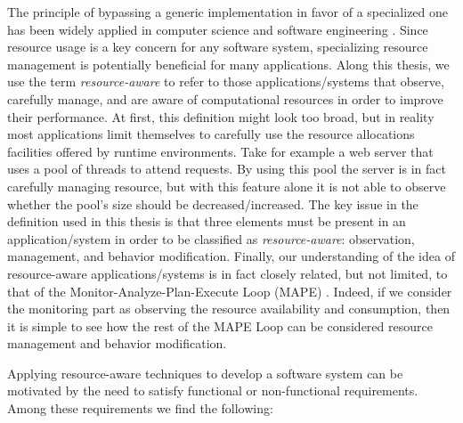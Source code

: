 The principle of bypassing a generic implementation in favor of a specialized one has been widely applied in computer science and software engineering \cite{engler1995exokernel, Munro1996,Dragos:2009:CGT:1565824.1565830, muller,Marinos:2014:NSS:2619239.2626311}.
Since resource usage is a key concern for any software system, specializing resource management is potentially beneficial for many applications.
Along this thesis, we use the term \textit{resource-aware} to refer to those applications/systems that observe, carefully manage, and are aware of computational resources in order to improve their performance. 
At first, this definition might look too broad, but in reality most applications limit themselves to carefully use the resource allocations facilities offered by runtime environments.
Take for example a web server that uses a pool of threads to attend requests.
By using this pool the server is in fact carefully managing resource, but with this feature alone it is not able to observe whether the pool's size should be decreased/increased.
The key issue in the definition used in this thesis is that three elements must be present in an application/system in order to be classified as \textit{resource-aware}: observation, management, and behavior modification. 
Finally, our understanding of the idea of resource-aware applications/systems is in fact closely related, but not limited, to that of the Monitor-Analyze-Plan-Execute Loop (MAPE) \cite{Brun:2009:ESS:1573856.1573860}.
Indeed, if we consider the monitoring part as observing the resource availability and consumption, then it is simple to see how the rest of the MAPE Loop can be considered resource management and behavior modification.

Applying resource-aware techniques to develop a software system can be motivated by the need to satisfy functional or non-functional requirements.
Among these requirements we find the following:

